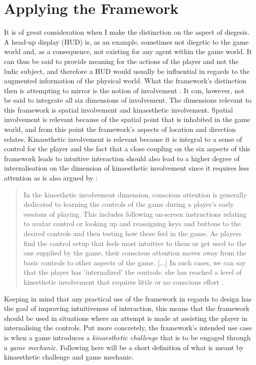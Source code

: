 \section{Applying the Framework}
It is of great consideration when I make the distinction on the aspect of diegesis. A head-up display (HUD) is, as an example, sometimes not diegetic to the game world and, as a consequence, not existing for any agent within the game world. It can thus be said to provide meaning for the actions of the player and not the ludic subject, and therefore a HUD would usually be influential in regards to the augmented information of the physical world. What the framework's distinction then is attempting to mirror is the notion of involvement \cite{calleja}. It can, however, not be said to integrate all six dimensions of involvement. The dimensions relevant to this framework is spatial involvement and kinaesthetic involvement. Spatial involvement is relevant because of the spatial point that is inhabited in the game world, and from this point the framework's aspects of location and direction relates. Kinaesthetic involvement is relevant because it is integral to a sense of control for the player and the fact that a close coupling on the six aspects of this framework leads to intuitive interaction \cite{frogger} should also lead to a higher degree of internalisation on the dimension of kinaesthetic involvement since it requires less attention as is also argued by \cite{calleja}:
\begin{quote}
  In the kinesthetic involvement dimension, conscious attention is generally dedicated to learning the controls of the game during a player’s early sessions of playing. This includes following on-screen instructions relating to avatar control or looking up and reassigning keys and buttons to the desired controls and then testing how these feel in the game. As players find the control setup that feels most intuitive to them or get used to the one supplied by the game, their conscious attention moves away from the basic controls to other aspects of the game. [...] In such cases, we can say that the player has 'internalized' the controls: she has reached a level of kinesthetic involvement that requires little or no conscious effort \cite[p. 45]{calleja}.
\end{quote}
Keeping in mind that any practical use of the framework in regards to design has the goal of improving intuitiveness of interaction, this means that the framework should be used in situations where an attempt is made at assisting the player in internalising the controls. Put more concretely, the framework's intended use case is when a game introduces a \textit{kinaesthetic challenge} that is to be engaged through a \textit{game mechanic}. Following here will be a short definition of what is meant by kinaesthetic challenge and game mechanic.

